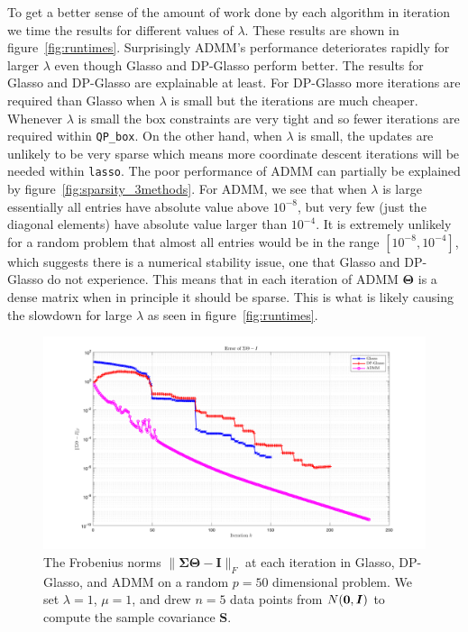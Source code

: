 \documentclass[10pt, letterpaper]{article}
\newcommand{\cov}{\boldsymbol \Sigma}
\newcommand{\preci}{\boldsymbol \Theta}
\newcommand{\sampcov}{\boldsymbol S} %
\newcommand{\eye}{\boldsymbol I} %
\newcommand{\bzero}{{\bf 0}}
\begin{document}
To get a better sense of the amount of work done by each algorithm in iteration we time the results for different values of $\lambda$.  These results are shown in figure~\ref{fig:runtimes}.  Surprisingly ADMM's performance deteriorates rapidly for larger $\lambda$ even though Glasso and DP-Glasso perform better.  The results for Glasso and DP-Glasso are explainable at least.  For DP-Glasso more iterations are required than Glasso when $\lambda$ is small but the iterations are much cheaper.  Whenever $\lambda$ is small the box constraints are very tight and so fewer iterations are required within \texttt{QP\_box}.  On the other hand, when $\lambda$ is small, the updates are unlikely to be very sparse which means more coordinate descent iterations will be needed within \texttt{lasso}.  The poor performance of ADMM can partially be explained by figure~\ref{fig:sparsity_3methods}.  For ADMM, we see that when $\lambda$ is large essentially all entries have absolute value above $10^{-8}$, but very few (just the diagonal elements) have absolute value larger than $10^{-4}$.  It is extremely unlikely for a random problem that almost all entries would be in the range $[10^{-8}, 10^{-4}]$, which suggests there is a numerical stability issue, one that Glasso and DP-Glasso do not experience.  This means that in each iteration of ADMM $\preci$ is a dense matrix when in principle it should be sparse.  This is what is likely causing the slowdown for large $\lambda$ as seen in figure~\ref{fig:runtimes}.\\




\begin{figure}
\centering
\includegraphics[width=\textwidth]{plots/normWX.png}
\caption{The Frobenius norms $\|\cov \preci- \eye\|_F$ at each iteration in Glasso, DP-Glasso, and ADMM on a random $p=50$ dimensional problem.  We set $\lambda = 1$, $\mu = 1$, and drew $n=5$ data points from $N(\bzero,\eye)$ to compute the sample covariance $\sampcov$.}
\label{fig:normWX}
\end{figure}
\end{document}
